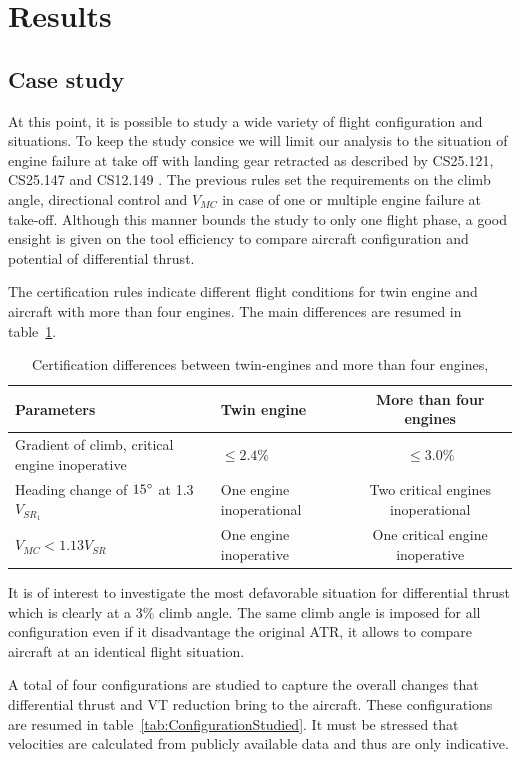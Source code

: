 \section{Results}

\subsection{Case study}
At this point, it is possible to study a wide variety of flight configuration and situations. To keep the study consice we will limit our analysis to the situation of engine failure at take off with landing gear retracted as described by CS25.121, CS25.147 and CS12.149 \cite{CS25}. The previous rules set the requirements on the climb angle, directional control and $V_{MC}$ in case of one or multiple engine failure at take-off. Although this manner bounds the study to only one flight phase, a good ensight is given on the tool efficiency to compare aircraft configuration and potential of differential thrust.

The certification rules indicate different flight conditions for twin engine and aircraft with more than four engines. The main differences are resumed in table~\ref{tab:DiffTwinMulti}. %
\begin{table}[hbt]
	\caption{\label{tab:DiffTwinMulti} Certification differences between twin-engines and more than four engines, \cite{CS25}} 
	\centering
	\begin{tabular}{l|l|c}
		Parameters & Twin engine & More than four engines\\
		\hline
		Gradient of climb, critical engine inoperative & $\leq 2.4\%$ & $\leq 3.0\%$\\
		Heading change of $15\degree$ at 1.3$V_{SR_1}$& One engine inoperational & Two critical engines inoperational\\
		$V_{MC} < 1.13 V_{SR}$ & One engine inoperative & One critical engine inoperative \\
	\end{tabular}
\end{table}

It is of interest to investigate the most defavorable situation for differential thrust which is clearly at a $3\%$ climb angle. The same climb angle is imposed for all configuration even if it disadvantage the original ATR, it allows to compare aircraft at an identical flight situation.

A total of four configurations are studied to capture the overall changes that differential thrust and VT reduction bring to the aircraft. These configurations are resumed in table~\ref{tab:ConfigurationStudied}. It must be stressed that velocities are calculated from publicly available data and thus are only indicative.

